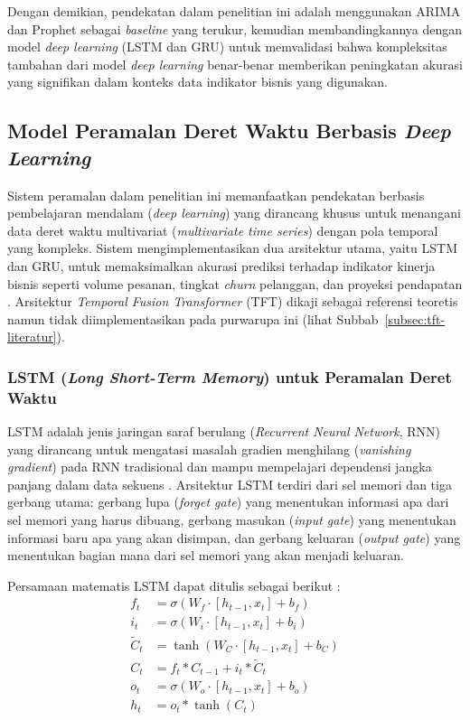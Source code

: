 Dengan demikian, pendekatan dalam penelitian ini adalah menggunakan ARIMA dan Prophet sebagai \textit{baseline} yang terukur, kemudian membandingkannya dengan model \textit{deep learning} (LSTM dan GRU) untuk memvalidasi bahwa kompleksitas tambahan dari model \textit{deep learning} benar-benar memberikan peningkatan akurasi yang signifikan dalam konteks data indikator bisnis yang digunakan.

\subsection{Model Peramalan Deret Waktu Berbasis \textit{Deep Learning}}

Sistem peramalan dalam penelitian ini memanfaatkan pendekatan berbasis pembelajaran mendalam (\textit{deep learning}) yang dirancang khusus untuk menangani data deret waktu multivariat (\textit{multivariate time series}) dengan pola temporal yang kompleks. Sistem mengimplementasikan dua arsitektur utama, yaitu LSTM dan GRU, untuk memaksimalkan akurasi prediksi terhadap indikator kinerja bisnis seperti volume pesanan, tingkat \textit{churn} pelanggan, dan proyeksi pendapatan \autocite{Yunita2025NNComparison,Zhang2024ComprehensiveTSFSurvey}. Arsitektur \textit{Temporal Fusion Transformer} (TFT) dikaji sebagai referensi teoretis namun tidak diimplementasikan pada purwarupa ini (lihat Subbab~\ref{subsec:tft-literatur}).

\subsubsection{LSTM (\textit{Long Short-Term Memory}) untuk Peramalan Deret Waktu}

LSTM adalah jenis jaringan saraf berulang (\textit{Recurrent Neural Network}, RNN)\label{abbr:RNN} yang dirancang untuk mengatasi masalah gradien menghilang (\textit{vanishing gradient}) pada RNN tradisional dan mampu mempelajari dependensi jangka panjang dalam data sekuens \autocite{Yunita2025NNComparison}. Arsitektur LSTM terdiri dari sel memori dan tiga gerbang utama: gerbang lupa (\textit{forget gate}) yang menentukan informasi apa dari sel memori yang harus dibuang, gerbang masukan (\textit{input gate}) yang menentukan informasi baru apa yang akan disimpan, dan gerbang keluaran (\textit{output gate}) yang menentukan bagian mana dari sel memori yang akan menjadi keluaran.

Persamaan matematis LSTM dapat ditulis sebagai berikut \autocite{Yunita2025NNComparison}:
\label{sym:ft}\label{sym:sigmoid}\label{sym:it}\label{sym:tanh}\label{sym:xt}\label{sym:ct}\label{sym:ot}\label{sym:ht}
\begin{align}
f_t &= \sigma(W_f \cdot [h_{t-1}, x_t] + b_f) \\
i_t &= \sigma(W_i \cdot [h_{t-1}, x_t] + b_i) \\
\tilde{C}_t &= \tanh(W_C \cdot [h_{t-1}, x_t] + b_C) \\
C_t &= f_t * C_{t-1} + i_t * \tilde{C}_t \\
o_t &= \sigma(W_o \cdot [h_{t-1}, x_t] + b_o) \\
h_t &= o_t * \tanh(C_t)
\end{align}

